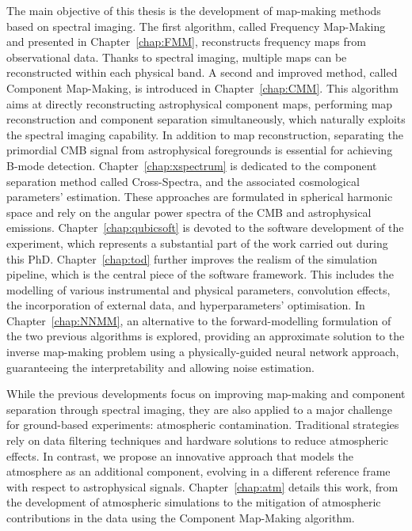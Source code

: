 \documentclass[../../thesis.tex]{subfiles}
\begin{document}
The main objective of this thesis is the development of map-making methods based on spectral imaging. The first algorithm, called Frequency Map-Making and presented in Chapter~\ref{chap:FMM}, reconstructs frequency maps from observational data. Thanks to spectral imaging, multiple maps can be reconstructed within each physical band. A second and improved method, called Component Map-Making, is introduced in Chapter~\ref{chap:CMM}. This algorithm aims at directly reconstructing astrophysical component maps, performing map reconstruction and component separation simultaneously, which naturally exploits the spectral imaging capability. In addition to map reconstruction, separating the primordial CMB signal from astrophysical foregrounds is essential for achieving B-mode detection. Chapter~\ref{chap:xspectrum} is dedicated to the component separation method called Cross-Spectra, and the associated cosmological parameters' estimation. These approaches are formulated in spherical harmonic space and rely on the angular power spectra of the CMB and astrophysical emissions. Chapter~\ref{chap:qubicsoft} is devoted to the software development of the experiment, which represents a substantial part of the work carried out during this PhD. Chapter~\ref{chap:tod} further improves the realism of the simulation pipeline, which is the central piece of the software framework. This includes the modelling of various instrumental and physical parameters, convolution effects, the incorporation of external data, and hyperparameters' optimisation. In Chapter~\ref{chap:NNMM}, an alternative to the forward-modelling formulation of the two previous algorithms is explored, providing an approximate solution to the inverse map-making problem using a physically-guided neural network approach, guaranteeing the interpretability and allowing noise estimation. 

While the previous developments focus on improving map-making and component separation through spectral imaging, they are also applied to a major challenge for ground-based experiments: atmospheric contamination. Traditional strategies rely on data filtering techniques and hardware solutions to reduce atmospheric effects. In contrast, we propose an innovative approach that models the atmosphere as an additional component, evolving in a different reference frame with respect to astrophysical signals. Chapter~\ref{chap:atm} details this work, from the development of atmospheric simulations to the mitigation of atmospheric contributions in the data using the Component Map-Making algorithm.

\end{document}
